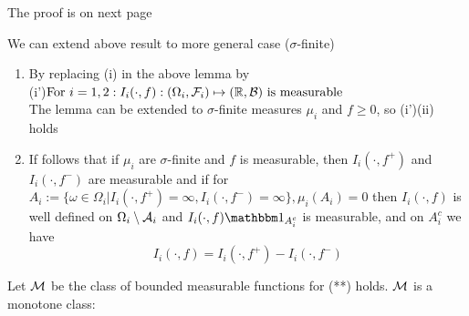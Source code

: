 The proof is on next page
\begin{rem}We can extend above result to more general case ($\sigma$-finite)
\begin{enumerate}
    \item By replacing (i) in the above lemma by \\
    (i')$\text{For } i=1,2: I_i(\cdot, f): (\Omega_i, \mathcal{F}_i) \mapsto (\mathbb{R}, \mathcal{B}) \text{ is measurable}$ \\
    The lemma can be extended to $\sigma$-finite measures $\mu_i$ and $f \geq 0$, so (i')(ii) holds
    \item If follows that if $\mu_i$ are $\sigma$-finite and $f$ is measurable, then $I_i(\cdot, f^+)$ and $I_i(\cdot, f^-)$ are measurable and if for $A_i:= \{\omega\in \Omega_i|I_i(\cdot, f^+) = \infty, I_i(\cdot, f^-)=\infty \}, \mu_i(A_i) = 0$ then $I_i(\cdot, f)$ is well defined on $\Omega_i \setminus \mathcal{A}_i$ and $I_i(\cdot, f)\I_{A_i^c}$ is measurable, and on $A_i^c$ we have 
    \begin{equation*}
        I_i(\cdot, f) = I_i(\cdot, f^+) - I_i(\cdot, f^-)
    \end{equation*}
\end{enumerate}
\end{rem}
\newpage
\pf Let $\mathcal{M}$ be the class of bounded measurable functions for (**) holds. $\mathcal{M}$ is a monotone class:
